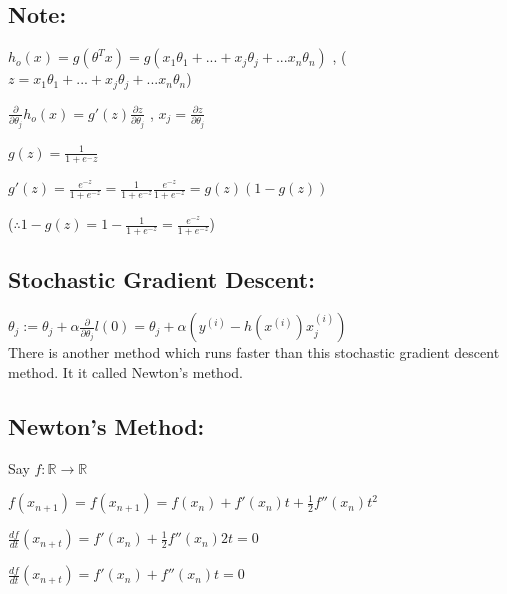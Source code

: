 \documentclass[11pt, oneside]{article}   	%
\begin{document}
\subsection*{Note:} $h_o(x) = g(\theta^Tx) = g(x_1\theta_1 + ... + x_j\theta_j + ... x_n\theta_n)$ , \hspace{1cm} ($z = {x_1\theta_1 + ... + x_j\theta_j + ... x_n\theta_n}$) \

$\frac{\partial}{\partial\theta_j} h_o(x) = g'(z) \frac{\partial z}{\partial\theta_j} $ , \hspace{5cm} $x_j = \frac{\partial z}{\partial\theta_j} $ \

$g(z) = \frac{1}{1 + e^-z}$\

$g'(z) = \frac{e^{-z}}{1 + e^{-z}} = \frac{1}{1 + e^{-z}} \frac{e^{-z}}{1 + e^{-z}} = g(z)(1-g(z))$\

($\therefore 1 - g(z) = 1 - \frac{1}{1 + e^{-z}} = \frac{e^{-z}}{1 + e^{-z}}$)\\

\subsection*{Stochastic Gradient Descent:}

$\theta_j := \theta_j + \alpha \frac{\partial}{\partial \theta_j} l(0) = \theta_j + \alpha (y^{(i)} - h(x^{(i)})x_j^{(i)})$ \\

There is another method which runs faster than this stochastic gradient descent method. It it called Newton's method.

\subsection*{Newton's Method:} 

Say $f : \mathds{R} \to \mathds{R}$ \

 $f(x_{n+1}) = f(x_{n+1}) = f(x_n) + f'(x_n)t + \frac{1}{2} f''(x_n)t^2$

$\frac{df}{dt}(x_{n+t}) = f'(x_n) + \frac{1}{2} f''(x_n)2t = 0$

$\frac{df}{dt}(x_{n+t}) = f'(x_n) + f''(x_n)t = 0$ \\
\end{document}
